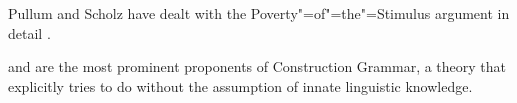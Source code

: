 Pullum and Scholz have dealt with the Poverty"=of"=the"=Stimulus argument in detail
 \citep{PS2002a,SP2002b}.

\citet{Goldberg2006a} and \citet{Tomasello2003a} are the most prominent proponents of Construction Grammar, a theory that explicitly tries
to do without the assumption of innate linguistic knowledge.

